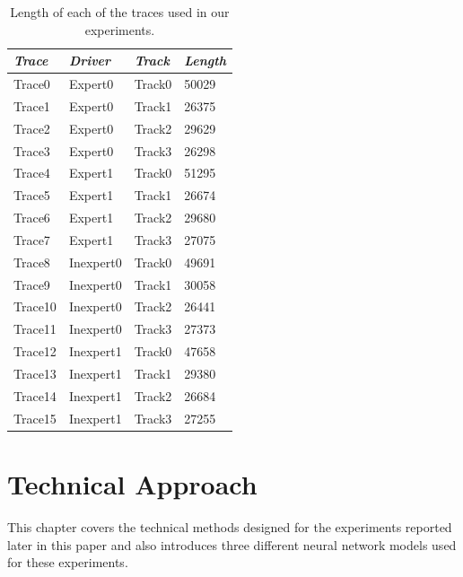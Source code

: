 \documentclass[draft,dvipsnames]{drexel-thesis}
\begin{document}
\begin{thesis}
\begin{table}[tb]
\centering
\caption{Length of each of the traces used in our experiments.}
\label{tbl:traces}
\begin{tabular}{|l|l|l|l|}
\hline
{\em Trace}   & {\em Driver}    & {\em Track}  & {\em Length} \\ \hline
Trace0  & Expert0   & Track0 & 50029  \\
Trace1  & Expert0   & Track1 & 26375  \\
Trace2  & Expert0   & Track2 & 29629  \\
Trace3  & Expert0   & Track3 & 26298  \\
Trace4  & Expert1   & Track0 & 51295  \\
Trace5  & Expert1   & Track1 & 26674  \\
Trace6  & Expert1   & Track2 & 29680  \\
Trace7  & Expert1   & Track3 & 27075  \\
Trace8  & Inexpert0 & Track0 & 49691  \\
Trace9  & Inexpert0 & Track1 & 30058  \\
Trace10 & Inexpert0 & Track2 & 26441  \\
Trace11 & Inexpert0 & Track3 & 27373  \\
Trace12 & Inexpert1 & Track0 & 47658  \\
Trace13 & Inexpert1 & Track1 & 29380  \\
Trace14 & Inexpert1 & Track2 & 26684  \\
Trace15 & Inexpert1 & Track3 & 27255  \\ \hline
\end{tabular}
\end{table}


\chapter{Technical Approach}\label{chap:tech_approach}

This chapter covers the technical methods designed for the experiments reported later in this paper and also introduces three different neural network models used for these experiments.



\end{thesis}
\end{document}
